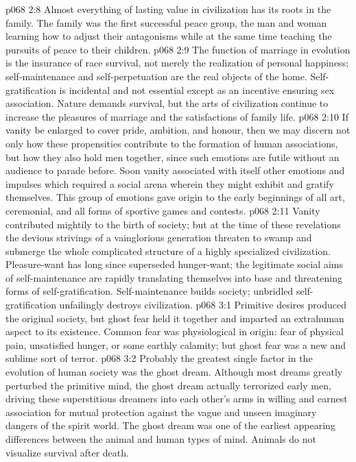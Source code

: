 \vs p068 2:8 Almost everything of lasting value in civilization has its roots in the family. The family was the first successful peace group, the man and woman learning how to adjust their antagonisms while at the same time teaching the pursuits of peace to their children.
\vs p068 2:9 The function of marriage in evolution is the insurance of race survival, not merely the realization of personal happiness; self\hyp{}maintenance and self\hyp{}perpetuation are the real objects of the home. Self\hyp{}gratification is incidental and not essential except as an incentive ensuring sex association. Nature demands survival, but the arts of civilization continue to increase the pleasures of marriage and the satisfactions of family life.
\vs p068 2:10 \pc If vanity be enlarged to cover pride, ambition, and honour, then we may discern not only how these propensities contribute to the formation of human associations, but how they also hold men together, since such emotions are futile without an audience to parade before. Soon vanity associated with itself other emotions and impulses which required a social arena wherein they might exhibit and gratify themselves. This group of emotions gave origin to the early beginnings of all art, ceremonial, and all forms of sportive games and contests.
\vs p068 2:11 Vanity contributed mightily to the birth of society; but at the time of these revelations the devious strivings of a vainglorious generation threaten to swamp and submerge the whole complicated structure of a highly specialized civilization. Pleasure\hyp{}want has long since superseded hunger\hyp{}want; the legitimate social aims of self\hyp{}maintenance are rapidly translating themselves into base and threatening forms of self\hyp{}gratification. Self\hyp{}maintenance builds society; unbridled self\hyp{}gratification unfailingly destroys civilization.
\vs p068 3:1 Primitive desires produced the original society, but ghost fear held it together and imparted an extrahuman aspect to its existence. Common fear was physiological in origin: fear of physical pain, unsatisfied hunger, or some earthly calamity; but ghost fear was a new and sublime sort of terror.
\vs p068 3:2 Probably the greatest single factor in the evolution of human society was the ghost dream. Although most dreams greatly perturbed the primitive mind, the ghost dream actually terrorized early men, driving these superstitious dreamers into each other’s arms in willing and earnest association for mutual protection against the vague and unseen imaginary dangers of the spirit world. The ghost dream was one of the earliest appearing differences between the animal and human types of mind. Animals do not visualize survival after death.
